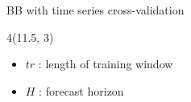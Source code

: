 \documentclass[
  12pt,
  ignorenonframetext,
  aspectratio=169,
]{beamer}
\begin{document}
\begin{frame}{BB with time series cross-validation}
\label{bb-with-time-series-cross-validation}

\begin{textblock}{4}(11.5, 3)
\fontsize{11}{12}\sf
\begin{block}{}
  \begin{itemize}
  \item \color{violet} {$tr$} : \color{black} length of training window \newline
  \item \color{violet} {$H$} : \color{black} forecast horizon \newline
\end{itemize}
\end{block}
\end{textblock}
\end{frame}
\end{document}
